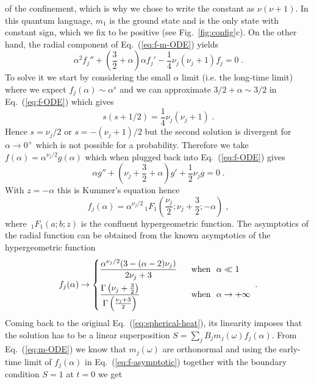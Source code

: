 \documentclass[aps,prl,twocolumn,superscriptaddress,floatfix,nofootinbib]{revtex4-2}
\begin{document}
of the confinement, which is why we chose to write the constant as $\nu(\nu+1)$. In this quantum language, $m_1$ is the ground state and is the only state with constant sign, which we fix to be positive (see Fig.~\ref{fig:config}c). On the other hand, the radial component of Eq.~(\ref{eq:f-m-ODE}) yields
\begin{equation} \label{eq:f-ODE}
    \alpha^2 f_j'' + \left(\frac{3}{2} + \alpha\right)\alpha f_j' - \frac{1}{4} \nu_j(\nu_j + 1) f_j = 0 \;. 
\end{equation}
To solve it we start by considering the small $\alpha$ limit (i.e. the long-time limit) where we expect $f_j(\alpha) \sim \alpha^s$ and we can approximate $3/2 + \alpha \sim 3/2$ in Eq.~(\ref{eq:f-ODE}) which gives
\begin{equation} \label{eq:s}
    s(s+1/2) = \frac{1}{4} \nu_j(\nu_j + 1)  \;. 
\end{equation}
Hence $s = \nu_j / 2$ or $s = - (\nu_j + 1)/2$ but the second solution is divergent for $\alpha \to 0^+$ which is not possible for a probability. Therefore we take $f(\alpha) = \alpha^{\nu_j/2} g(\alpha)$ which when plugged back into Eq.~(\ref{eq:f-ODE}) gives
\begin{equation} \label{eq:g-ODE}
    \alpha g'' + \left(\nu_j + \frac{3}{2} + \alpha\right) g' + \frac{1}{2} \nu_j g = 0 \;.
\end{equation}
With $z = -\alpha$ this is Kummer's equation \cite{DLMF} hence
\begin{equation} \label{eq:f-solution}
    f_j(\alpha) = \alpha^{\nu_j/2} \,_1F_1\left(\frac{\nu_j}{2}; \nu_j + \frac{3}{2} ; - \alpha\right) \;,
\end{equation}
where $\,_1F_1(a;b;z)$ is the confluent hypergeometric function. The asymptotics of the radial function can be obtained from the known asymptotics of the hypergeometric function
\begin{equation}\label{eq:f-asymptotic}
    f_j(\alpha) \to \begin{dcases}
        \frac{\alpha ^{\nu_j /2} (3-(\alpha -2) \nu_j )}{2 \nu_j +3} &\mbox{~~when~~} \alpha \ll 1\\
        \frac{\Gamma \left(\nu_j +\frac{3}{2}\right)}{\Gamma \left(\frac{\nu_j +3}{2}\right)} &\mbox{~~when~~} \alpha \to +\infty
    \end{dcases} \;.
\end{equation}
Coming back to the original Eq.~(\ref{eq:spherical-heat}), its linearity imposes that the solution has to be a linear superposition $S = \sum_j B_j m_j(\omega) f_j(\alpha)$. From Eq.~(\ref{eq:m-ODE}) we know that $m_j(\omega)$ are orthonormal and using the early-time limit of $f_j(\alpha)$ in Eq.~(\ref{eq:f-asymptotic}) together with the boundary condition $S = 1$ at $t = 0$ we get
\end{document}

